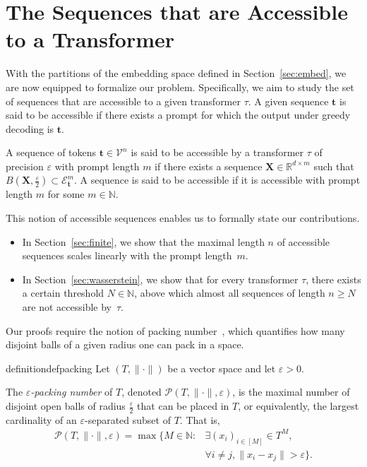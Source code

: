 \section{The Sequences that are Accessible to a Transformer}\label{sec:main}

With the partitions of the embedding space defined in Section~\ref{sec:embed}, we are now equipped to formalize our problem. Specifically, we aim to study the set of sequences that are accessible to a given transformer $\tau$. A given sequence $\mathbf t$ is said to be accessible if there exists a prompt for which the output under greedy decoding is $\mathbf t$.

\begin{definition}
    A sequence of tokens $\mathbf t\in\mathcal V^{n}$ is said to be accessible by a transformer $\tau$ of precision $\varepsilon$ with prompt length $m$ if there exists a sequence $\mathbf X\in\mathbb R^{d\times m}$ such that $B(\mathbf X,\frac\varepsilon2)\subset\mathcal E^m_{\mathbf t}$. A sequence is said to be accessible if it is accessible with prompt length $m$ for some $m\in\mathbb N$.
\end{definition}

This notion of accessible sequences enables us to formally state our contributions.

\begin{itemize}
    \item In Section~\ref{sec:finite}, we show that the maximal length $n$ of accessible sequences scales linearly with the prompt length~$m$.
    \item In Section~\ref{sec:wasserstein}, we show that for every transformer $\tau$, there exists a certain threshold $N\in\mathbb N$, above which almost all sequences of length $n\ge N$ are not accessible by~$\tau$.
\end{itemize}

Our proofs require the notion of packing number~\citep{Vershynin_R_2018_b_covering-number}, which quantifies how many disjoint balls of a given radius one can pack in a space.

\begin{restatable}{definition}{defpacking}
    Let \( (T, \|\cdot\|) \) be a vector space and let \( \varepsilon > 0 \).

    The \emph{\( \varepsilon \)-packing number} of \( T \), denoted \( \mathcal{P}(T, \|\cdot\|, \varepsilon) \), is the maximal number of disjoint open balls of radius \( \frac\varepsilon2 \) that can be placed in \( T \), or equivalently, the largest cardinality of an \( \varepsilon \)-separated subset of \( T \). That is,
    \begin{align*}
        \mathcal{P}(T, \|\cdot\|, \varepsilon)=\max\{ M \in \mathbb{N} \colon&\exists (x_i)_{i\in[M]}\in T^M,\\&\forall i \neq j, \|x_i-x_j\| > \varepsilon\}.
    \end{align*}
\end{restatable}

